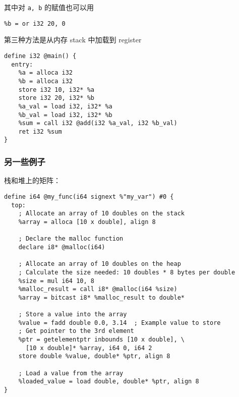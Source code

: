 其中对 \verb`a, b` 的赋值也可以用
\begin{lstlisting}[language=none]
%a = or i32 10, 0
%b = or i32 20, 0
\end{lstlisting}

第三种方法是从内存 stack 中加载到 register
\begin{lstlisting}[language=none]
define i32 @main() {
  entry:
    %a = alloca i32
    %b = alloca i32
    store i32 10, i32* %a
    store i32 20, i32* %b
    %a_val = load i32, i32* %a
    %b_val = load i32, i32* %b
    %sum = call i32 @add(i32 %a_val, i32 %b_val)
    ret i32 %sum
}
\end{lstlisting}

\subsubsection{另一些例子}
栈和堆上的矩阵：
\begin{lstlisting}[language=none]
define i64 @my_func(i64 signext %"my_var") #0 {
  top:
    ; Allocate an array of 10 doubles on the stack
    %array = alloca [10 x double], align 8

    ; Declare the malloc function
    declare i8* @malloc(i64)

    ; Allocate an array of 10 doubles on the heap
    ; Calculate the size needed: 10 doubles * 8 bytes per double
    %size = mul i64 10, 8
    %malloc_result = call i8* @malloc(i64 %size)
    %array = bitcast i8* %malloc_result to double*

    ; Store a value into the array
    %value = fadd double 0.0, 3.14  ; Example value to store
    ; Get pointer to the 3rd element
    %ptr = getelementptr inbounds [10 x double], \
      [10 x double]* %array, i64 0, i64 2
    store double %value, double* %ptr, align 8

    ; Load a value from the array
    %loaded_value = load double, double* %ptr, align 8
}
\end{lstlisting}

